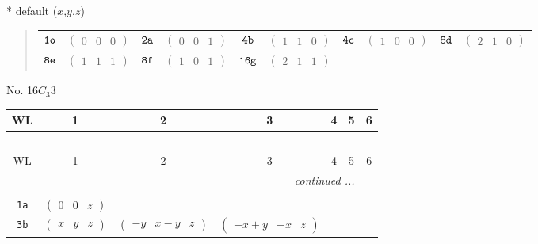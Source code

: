 \documentclass[fleqn,9pt,landscape]{jsarticle}
\begin{document}
* default ($x$,$y$,$z$)
\begin{quote}
\begin{tabular}{cccccccccc}
$ {\tt 1o} $ & $ \begin{pmatrix} 0 & 0 & 0 \end{pmatrix} $ & $ {\tt 2a} $ & $ \begin{pmatrix} 0 & 0 & 1 \end{pmatrix} $ & $ {\tt 4b} $ & $ \begin{pmatrix} 1 & 1 & 0 \end{pmatrix} $ & $ {\tt 4c} $ & $ \begin{pmatrix} 1 & 0 & 0 \end{pmatrix} $ & $ {\tt 8d} $ & $ \begin{pmatrix} 2 & 1 & 0 \end{pmatrix} $ \\
$ {\tt 8e} $ & $ \begin{pmatrix} 1 & 1 & 1 \end{pmatrix} $ & $ {\tt 8f} $ & $ \begin{pmatrix} 1 & 0 & 1 \end{pmatrix} $ & $ {\tt 16g} $ & $ \begin{pmatrix} 2 & 1 & 1 \end{pmatrix} $ & $  $ & $  $ & $  $ & $  $
\end{tabular}
\end{quote}
\newpage
No. 16\quad$C_{3}$\quad$3$\quad[ trigonal ]
\begin{center}
\renewcommand{\arraystretch}{1.2}
\begin{longtable}{ccccccc}
 \hline \hline
WL & 1 & 2 & 3 & 4 & 5 & 6 \\ \hline \endfirsthead

\multicolumn{6}{l}{\tablename\ \thetable{}} \\
 \hline \hline
WL & 1 & 2 & 3 & 4 & 5 & 6 \\ \hline \endhead

 \hline \hline
\multicolumn{6}{r}{\footnotesize\it continued ...} \\ \endfoot

 \hline \hline
\multicolumn{6}{r}{} \\ \endlastfoot

{\tt 1a} & $ \begin{pmatrix} 0 & 0 & z \end{pmatrix} $ & $  $ & $  $ \\ \hline
{\tt 3b} & $ \begin{pmatrix} x & y & z \end{pmatrix} $ & $ \begin{pmatrix} - y & x - y & z \end{pmatrix} $ & $ \begin{pmatrix} - x + y & - x & z \end{pmatrix} $ \\
\end{longtable}
\end{center}
\end{document}

